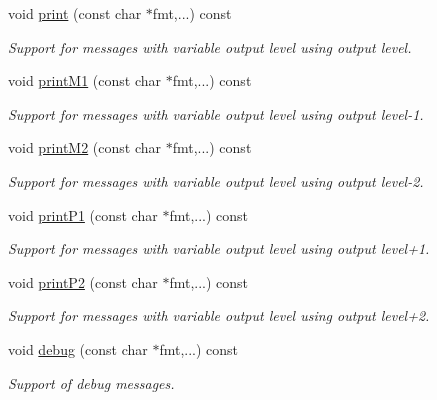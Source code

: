 \begin{DoxyCompactItemize}
void \hyperlink{class_d_d4hep_1_1_simulation_1_1_geant4_action_abff9f8350b90ba55ee98041b0c6291ae}{print} (const char $\ast$fmt,...) const 
\begin{DoxyCompactList}\small\item\em Support for messages with variable output level using output level. \item\end{DoxyCompactList}\item 
void \hyperlink{class_d_d4hep_1_1_simulation_1_1_geant4_action_a902ac87d9764b8fdb6abba259482713b}{printM1} (const char $\ast$fmt,...) const 
\begin{DoxyCompactList}\small\item\em Support for messages with variable output level using output level-\/1. \item\end{DoxyCompactList}\item 
void \hyperlink{class_d_d4hep_1_1_simulation_1_1_geant4_action_affc21c47844a7be6edf2824d4d042e64}{printM2} (const char $\ast$fmt,...) const 
\begin{DoxyCompactList}\small\item\em Support for messages with variable output level using output level-\/2. \item\end{DoxyCompactList}\item 
void \hyperlink{class_d_d4hep_1_1_simulation_1_1_geant4_action_a655489f4d250231f566c6db624a70410}{printP1} (const char $\ast$fmt,...) const 
\begin{DoxyCompactList}\small\item\em Support for messages with variable output level using output level+1. \item\end{DoxyCompactList}\item 
void \hyperlink{class_d_d4hep_1_1_simulation_1_1_geant4_action_a03ed6b722207ae7b656bf19c8e070fba}{printP2} (const char $\ast$fmt,...) const 
\begin{DoxyCompactList}\small\item\em Support for messages with variable output level using output level+2. \item\end{DoxyCompactList}\item 
void \hyperlink{class_d_d4hep_1_1_simulation_1_1_geant4_action_a89cb100e04f08e07046e7d490a8bc747}{debug} (const char $\ast$fmt,...) const 
\begin{DoxyCompactList}\small\item\em Support of debug messages. \item\end{DoxyCompactList}\item 

\end{DoxyCompactItemize}
